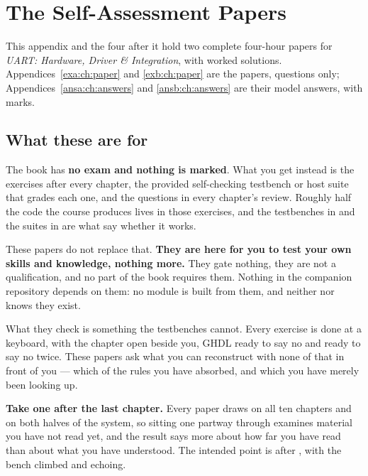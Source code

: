 
\chapter{The Self-Assessment Papers}
\label{exam:ch:about}

This appendix and the four after it hold two complete four-hour papers for \emph{UART: Hardware,
Driver \& Integration}, with worked solutions. Appendices~\ref{exa:ch:paper} and \ref{exb:ch:paper}
are the papers, questions only; Appendices~\ref{ansa:ch:answers} and \ref{ansb:ch:answers} are their
model answers, with marks.

\section*{What these are for}
The book has \textbf{no exam and nothing is marked}. What you get instead is the exercises after
every chapter, the provided self-checking testbench or host suite that grades each one, and the
questions in every chapter's review. Roughly half the code the course produces lives in those
exercises, and the testbenches in  and the suites in  are what say whether it
works.

These papers do not replace that. \textbf{They are here for you to test your own skills and
knowledge, nothing more.} They gate nothing, they are not a qualification, and no part of the book
requires them. Nothing in the companion repository depends on them: no module is built from them,
and neither  nor  knows they exist.

What they check is something the testbenches cannot. Every exercise is done at a keyboard, with the
chapter open beside you, GHDL ready to say no and  ready to say no twice. These
papers ask what you can reconstruct with none of that in front of you --- which of the rules you
have absorbed, and which you have merely been looking up.

\textbf{Take one after the last chapter.} Every paper draws on all ten chapters and on both halves of
the system, so sitting one partway through examines material you have not read yet, and the result
says more about how far you have read than about what you have understood. The intended point is
after , with the bench climbed and  echoing.


